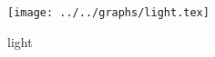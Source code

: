 \begin{figure}[h] \centering \texttt{[image: ../../graphs/light.tex]}\caption{light}\label{gr:light} \end{figure}
